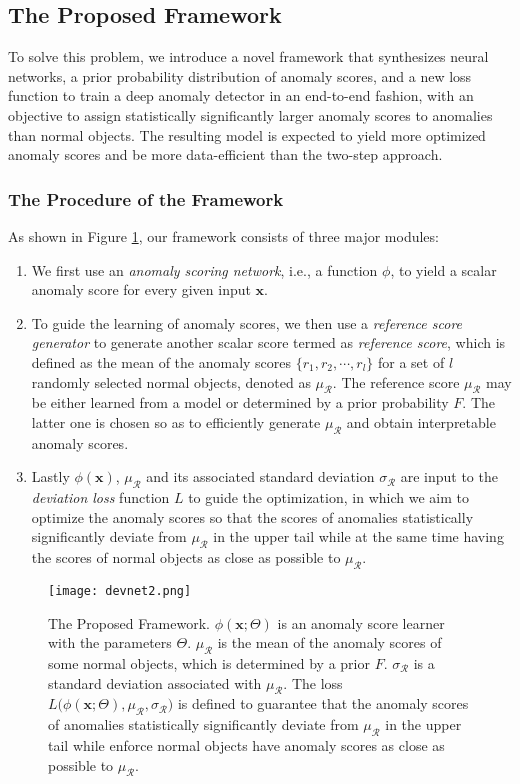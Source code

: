 \documentclass[sigconf]{acmart}
\begin{document}
\subsection{The Proposed Framework}

To solve this problem, we introduce a novel framework that synthesizes neural networks, a prior probability distribution of anomaly scores, and a new loss function to train a deep anomaly detector in an end-to-end fashion, with an objective to assign statistically significantly larger anomaly scores to anomalies than normal objects. The resulting model is expected to yield more optimized anomaly scores and be more data-efficient than the two-step approach. 

\subsubsection{The Procedure of the Framework}
As shown in Figure \ref{fig:framework}, our framework consists of three major modules: 
\begin{enumerate}
    \item We first use an \textit{anomaly scoring network}, i.e., a function $\phi$, to yield a scalar anomaly score for every given input $\mathbf{x}$.
    \item To guide the learning of anomaly scores, we then use a \textit{reference score generator} to generate another scalar score termed as \textit{reference score}, which is defined as the mean of the anomaly scores $\{r_1, r_2, \cdots, r_l\}$ for a set of $l$ randomly selected normal objects, denoted as $\mu_{\mathcal{R}}$. The reference score $\mu_{\mathcal{R}}$ may be either learned from a model or determined by a prior probability $F$. The latter one is chosen so as to efficiently generate $\mu_{\mathcal{R}}$ and obtain interpretable anomaly scores. 
    \item Lastly $\phi(\mathbf{x})$, $\mu_{\mathcal{R}}$ and its associated standard deviation $\sigma_{\mathcal{R}}$ are input to the \textit{deviation loss} function $L$ to guide the optimization, in which we aim to optimize the anomaly scores so that the scores of anomalies statistically significantly deviate from $\mu_{\mathcal{R}}$ in the upper tail while at the same time having the scores of normal objects as close as possible to $\mu_{\mathcal{R}}$.
\end{enumerate}
 
\begin{figure}[h!]
  \centering
    \texttt{[image: devnet2.png]}
  \caption{The Proposed Framework. $\phi(\mathbf{x}; \Theta)$ is an anomaly score learner with the parameters $\Theta$. $\mu_{\mathcal{R}}$ is the mean of the anomaly scores of some normal objects, which is determined by a prior $F$. $\sigma_{\mathcal{R}}$ is a standard deviation associated with $\mu_{\mathcal{R}}$. The loss $L\big(\phi(\mathbf{x}; \Theta), \mu_{\mathcal{R}}, \sigma_{\mathcal{R}}\big)$ is defined to guarantee that the anomaly scores of anomalies statistically significantly deviate from $\mu_{\mathcal{R}}$ in the upper tail while enforce normal objects have anomaly scores as close as possible to $\mu_{\mathcal{R}}$. }
  \label{fig:framework}
\end{figure}
\end{document}
